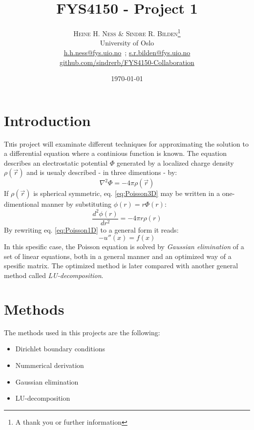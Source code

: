 \documentclass[twoside,twocolumn]{article}
\title{FYS4150 - Project 1} %
\author{%
\textsc{Heine H. Ness \& Sindre R. Bilden}\thanks{A thank you or further information} \\[1ex] %
\normalsize University of Oslo \\ %
\normalsize \href{mailto:h.h.ness@fys.uio.no}{h.h.ness@fys.uio.no}\ ; \href{mailto:s.r.bilden@fys.uio.no}{s.r.bilden@fys.uio.no}\\%
\normalsize \href{https://github.com/sindrerb/FYS4150-Collaboration}{github.com/sindrerb/FYS4150-Collaboration}
}
\date{\today} %
\begin{document}
\maketitle


\section{Introduction}

\lettrine[nindent=0em,lines=3]{T}his project will examinate different techniques for approximating the solution to a differential equation where a continious function is known. The equation describes an electrostatic potential $\Phi$ generated by a localized charge density $\rho(\vec{r})$ and is usualy described - in three dimentions - by:
\begin{equation}
\nabla^2\Phi = -4\pi \rho(\vec{r}) \label{eq:Poisson3D}
\end{equation}
If $\rho(\vec{r})$ is spherical symmetric, eq. \ref{eq:Poisson3D} may be written in a one-dimentional manner by substituting $\phi(r)=r\Phi(r)$:
\begin{equation}
\frac{d^2\phi(r)}{dr^2}=-4\pi r\rho(r) \label{eq:Poisson1D}
\end{equation}
By rewriting eq. \ref{eq:Poisson1D} to a general form it reads:
\begin{equation}
-u''(x)=f(x)
\end{equation}
In this spesific case, the Poisson equation is solved by \textit{Gaussian elimination} of a set of linear equations, both in a general manner and an optimized way of a spesific matrix. The optimized method is later compared with another general method called \textit{LU-decomposition}.


\section{Methods}
The methods used in this projects are the following:
\begin{itemize}
\item Dirichlet boundary conditions
\item Nummerical derivation
\item Gaussian elimination
\item LU-decomposition
\end{itemize}
\end{document}
